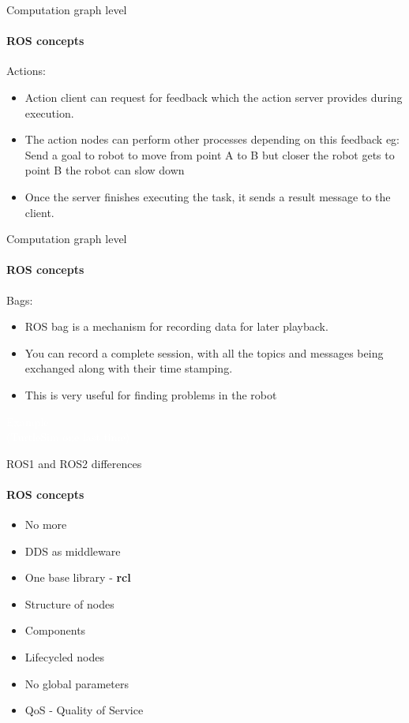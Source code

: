 \documentclass{beamer}
\begin{document}
\begin{frame}{Computation graph level}
    \framesubtitle{ROS concepts}
    {\huge Actions:}
    \vspace{0.2cm}
    \begin{itemize}        
        \item Action client can  request for feedback which the action server provides during execution. 
        \item The action nodes can perform other processes depending on this feedback
        eg: Send a goal to robot to move from point A to B but closer the robot gets to point B the robot can slow down 
        \item Once the server finishes executing the task, it sends a result message to the client.
    \end{itemize}  
\end{frame}


\begin{frame}{Computation graph level}
    \framesubtitle{ROS concepts}
    {\huge Bags:}
    \vspace{0.2cm}
    \begin{itemize}
        \item ROS bag is a mechanism for recording data for later playback.
        \item You can record a complete session, with all the topics and messages
        being exchanged along with their time stamping.
        
        \item This is very useful for finding problems in the robot
    \end{itemize}  
\end{frame}

\begin{frame}[plain]{}  
    \centering
    {\huge \textcolor{white}{Example \\ (TurtleSim one last time)} }
   \end{frame}

\begin{frame}{ROS1 and ROS2 differences}
    \framesubtitle{ROS concepts}
    \begin{itemize}
        \item No more 
        \item DDS as middleware
        \item One base library - \textbf{rcl}
        \item Structure of nodes
        \item Components
        \item Lifecycled nodes
        \item No global parameters
        \item QoS - Quality of Service
    \end{itemize}
\end{frame}
\end{document}
